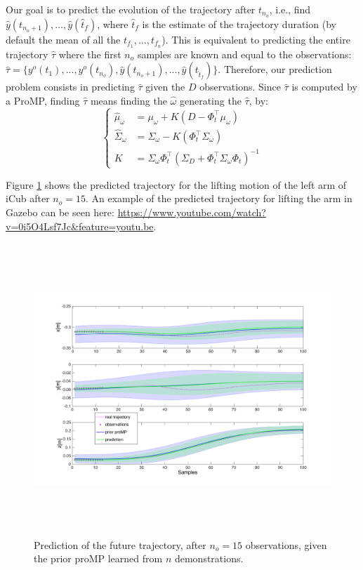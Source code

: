 Our goal is to predict the evolution of the trajectory after $t_{n_o}$, i.e., find $\hat{y}(t_{n_o+1}),\ldots,\hat{y}(\hat{t}_f)$, where $\hat{t}_f$ is the estimate of the trajectory duration (by default the mean of all the $t_{f_1}, \ldots, t_{f_n}$). 
This is equivalent to predicting the entire trajectory $\hat{\tau}$ where the first $n_o$ samples are known and equal to the observations: $\hat{\tau} = \{y^o(t_{1}), ..., y^o(t_{n_o}), \hat{y}(t_{n_o+1}), ..., \hat{y}(t_{\hat{t}_f})\}$.
Therefore, our prediction problem consists in predicting $\hat{\tau}$ given the $D$ observations. Since $\hat{\tau}$ is computed by a ProMP, finding $\hat{\tau}$ means finding the $\hat{\omega}$ generating the  $\hat{\tau}$, by:
$$\left\{
\begin{array}{rl}
\hat{\mu}_\omega &= \mu_\omega + K(D - \Phi_t^\top \mu_\omega) \\ 
\hat{\Sigma}_\omega &= \Sigma_\omega - K(\Phi_t^\top \Sigma_\omega) \\
K&= \Sigma_\omega\Phi_t^\top(\Sigma_D + \Phi_t^\top\Sigma_\omega \Phi_t)^{-1}
\end{array}
\right.$$

Figure \ref{fig:predictionLifting15} shows the predicted trajectory for the lifting motion of the left arm of iCub after $n_{o}=15$. An example of the predicted trajectory for lifting the arm in Gazebo can be seen here: \url{https://www.youtube.com/watch?v=0i5O4Lsf7Jc&feature=youtu.be}.


\begin{figure}[h]
\centering
\includegraphics[height=11cm]{figs/proMP_prediction.pdf}
\caption{Prediction of the future trajectory, after $n_o=15$ observations, given the prior proMP learned from $n$ demonstrations.}
\label{fig:predictionLifting15}
\end{figure}









